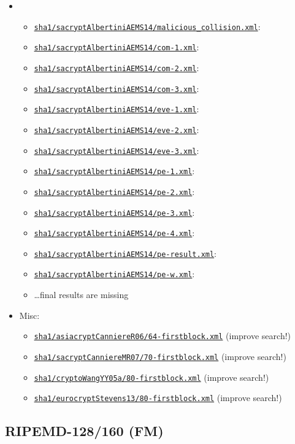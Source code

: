 \documentclass[11pt, a4paper]{article}
\newcommand{\hashlink}[2][black]{\href{https://extgit.iaik.tugraz.at/krypto/nldtool/blob/master/hash/#2}{\color{#1}\nolinkurl{#2}}}
\begin{document}
\begin{itemize}
  \item {}
    \begin{itemize}
      \item \hashlink[todo]{sha1/sacryptAlbertiniAEMS14/malicious_collision.xml}: 
      \item \hashlink[todo]{sha1/sacryptAlbertiniAEMS14/com-1.xml}: 
      \item \hashlink[todo]{sha1/sacryptAlbertiniAEMS14/com-2.xml}: 
      \item \hashlink[todo]{sha1/sacryptAlbertiniAEMS14/com-3.xml}: 
      \item \hashlink[todo]{sha1/sacryptAlbertiniAEMS14/eve-1.xml}: 
      \item \hashlink[todo]{sha1/sacryptAlbertiniAEMS14/eve-2.xml}: 
      \item \hashlink[todo]{sha1/sacryptAlbertiniAEMS14/eve-3.xml}: 
      \item \hashlink[todo]{sha1/sacryptAlbertiniAEMS14/pe-1.xml}: 
      \item \hashlink[todo]{sha1/sacryptAlbertiniAEMS14/pe-2.xml}: 
      \item \hashlink[todo]{sha1/sacryptAlbertiniAEMS14/pe-3.xml}: 
      \item \hashlink[todo]{sha1/sacryptAlbertiniAEMS14/pe-4.xml}: 
      \item \hashlink[todo]{sha1/sacryptAlbertiniAEMS14/pe-result.xml}: 
      \item \hashlink[todo]{sha1/sacryptAlbertiniAEMS14/pe-w.xml}: 
      \item \dots final results are missing
    \end{itemize}
  \item Misc:
    \begin{itemize}
      \item \hashlink[todo]{sha1/asiacryptCanniereR06/64-firstblock.xml} (improve search!)
      \item \hashlink[todo]{sha1/sacryptCanniereMR07/70-firstblock.xml} (improve search!)
      \item \hashlink[todo]{sha1/cryptoWangYY05a/80-firstblock.xml} (improve search!)
      \item \hashlink[todo]{sha1/eurocryptStevens13/80-firstblock.xml} (improve search!)

    \end{itemize}
\end{itemize}

\subsection{RIPEMD-128/160 (FM)}
\end{document}
